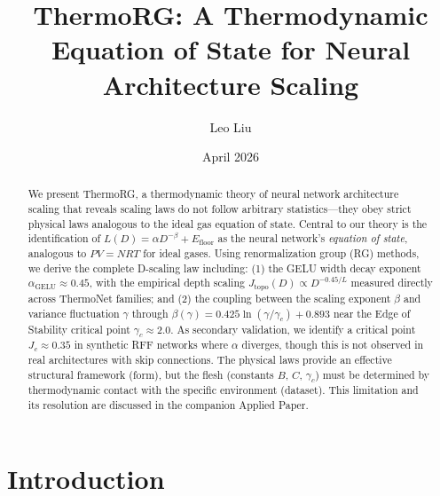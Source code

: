 \documentclass[11pt, a4paper]{article}
\theoremstyle{plain}
\begin{document}
\title{ThermoRG: A Thermodynamic Equation of State for Neural Architecture Scaling}

\author{Leo Liu}

\date{April 2026}

\maketitle

\begin{abstract}
We present ThermoRG, a thermodynamic theory of neural network architecture scaling that reveals scaling laws do not follow arbitrary statistics---they obey strict physical laws analogous to the ideal gas equation of state. Central to our theory is the identification of $L(D) = \alpha D^{-\beta} + E_{\mathrm{floor}}$ as the neural network's \emph{equation of state}, analogous to $PV = NRT$ for ideal gases. Using renormalization group (RG) methods, we derive the complete D-scaling law including: (1) the GELU width decay exponent $\alpha_{\mathrm{GELU}} \approx 0.45$, with the empirical depth scaling $J_{\mathrm{topo}}(D) \propto D^{-0.45/L}$ measured directly across ThermoNet families; and (2) the coupling between the scaling exponent $\beta$ and variance fluctuation $\gamma$ through $\beta(\gamma) = 0.425\ln(\gamma/\gamma_c) + 0.893$ near the Edge of Stability critical point $\gamma_c \approx 2.0$. As secondary validation, we identify a critical point $J_c \approx 0.35$ in synthetic RFF networks where $\alpha$ diverges, though this is not observed in real architectures with skip connections. The physical laws provide an effective structural framework (form), but the flesh (constants $B$, $C$, $\gamma_c$) must be determined by thermodynamic contact with the specific environment (dataset). This limitation and its resolution are discussed in the companion Applied Paper.
\end{abstract}

\section{Introduction}
\end{document}
